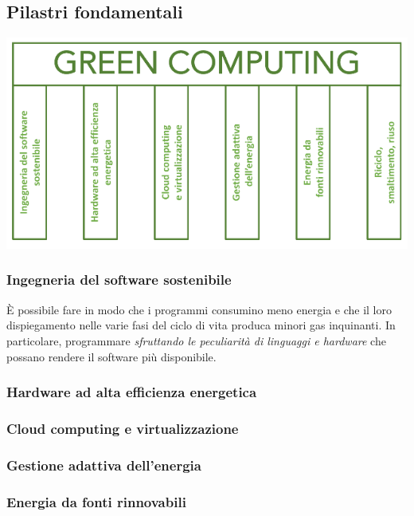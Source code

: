 \subsection{Pilastri fondamentali}
\begin{center}
	\includegraphics[scale=0.5]{green_pilastri.png}
\end{center}
\subsubsection{Ingegneria del software sostenibile}
È possibile fare in modo che i programmi consumino meno energia e che il loro dispiegamento nelle varie fasi del ciclo di vita produca minori gas inquinanti. In particolare, programmare \emph{sfruttando le peculiarità di linguaggi e hardware} che possano rendere il software più disponibile.
\subsubsection{Hardware ad alta efficienza energetica}
\subsubsection{Cloud computing e virtualizzazione}
\subsubsection{Gestione adattiva dell'energia}
\subsubsection{Energia da fonti rinnovabili}

